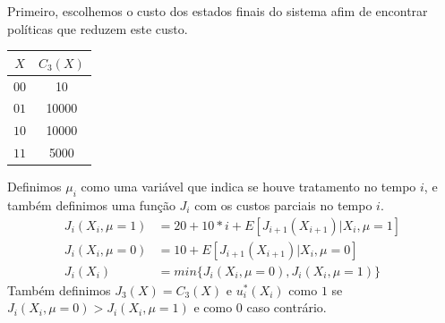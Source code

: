 \documentclass[12pt]{article}
\begin{document}
Primeiro, escolhemos o custo dos estados finais do sistema afim de 
encontrar políticas que reduzem este custo.
\begin{center}
\begin{tabular}{c | c }
 $X$ & $C_3(X)$ \\
  \hline
  $00$ & 10 \\
  $01$ & 10000 \\
  $10$ & 10000 \\
  $11$ & 5000 \\
\end{tabular}
\end{center}

Definimos $\mu_i$ como uma variável que indica se houve tratamento no
tempo $i$, e também definimos uma função $J_i$ com os custos parciais 
no tempo $i$.
\begin{align*}
  J_i (X_i, \mu = 1) & = 20 + 10 * i + E [J_{i + 1} (X_{i+1}) | X_i, \mu = 1] \\
  J_i (X_i, \mu = 0) & = 10 + E [J_{i + 1} (X_{i+1}) | X_i, \mu = 0] \\
  J_i (X_i) &= min\{ J_i (X_i, \mu = 0), J_i (X_i, \mu = 1)\}
\end{align*}
Também definimos $J_3 (X) = C_3  (X)$ e $u_i^*(X_i)$ como $1$ se 
$J_i (X_i, \mu = 0) > J_i (X_i, \mu = 1)$ e como $0$ caso contrário. 
\end{document}
